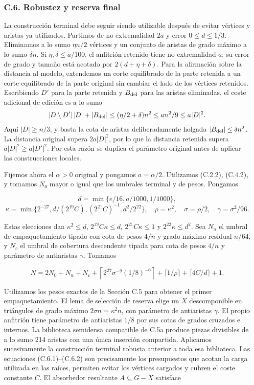 \documentclass[spanish,11pt,a4paper]{article}
\begin{document}
\subsubsection{C.6. Robustez y reserva final}\label{c.6.-robustez-y-reserva-final}

La construcción terminal debe seguir siendo utilizable después de evitar vértices y aristas ya utilizados. Partimos de no extremalidad \(2a\) y error \(0\le d\le1/3\). Eliminamos a lo sumo \(\eta n/2\) vértices y un conjunto de aristas de grado máximo a lo sumo \(\delta n\). Si \(\eta,\delta\le a/100\), el anfitrión retenido tiene no extremalidad \(a\); su error de grado y tamaño está acotado por \(2(d+\eta+\delta)\). Para la afirmación sobre la distancia al modelo, extendemos un corte equilibrado de la parte retenida a un corte equilibrado de la parte original sin cambiar el lado de los vértices retenidos. Escribiendo \(D'\) para la parte retenida y \(B_{\rm del}\) para las aristas eliminadas, el coste adicional de edición es a lo sumo \[|D\setminus D'|\,|D|+|B_{\rm del}|
\le(\eta/2+\delta)n^2\le an^2/9\le a|D|^2.\] Aquí \(|D|\ge n/3\), y basta la cota de aristas deliberadamente holgada \(|B_{\rm del}|\le\delta n^2\). La distancia original supera \(2a|D|^2\), por lo que la distancia retenida supera \(a|D|^2\ge a|D'|^2\). Por esta razón se duplica el parámetro original antes de aplicar las construcciones locales.

Fijemos ahora el \(\alpha>0\) original y pongamos \(a=\alpha/2\). Utilizamos (C.2.2), (C.4.2), y tomamos \(N_0\) mayor o igual que los umbrales terminal y de pesos. Pongamos

\[d=\min\{e/16,a/1000,1/1000\},\] \[\kappa=\min\{2^{-27},d/(2^{19}C),(2^{21}C)^{-1},d^2/2^{22}\},
\quad\rho=\kappa^2,\quad\sigma=\rho/2,\quad\gamma=\sigma^2/96.
\tag{C.6.1}\]

Estas elecciones dan \(\kappa^2\le d\), \(2^{19}C\kappa\le d\), \(2^{21}C\kappa\le1\) y \(2^{22}\kappa\le d^2\). Sea \(N_n\) el umbral de empaquetamiento tipado con cota de pesos \(4/n\) y grado máximo residual \(n/64\), y \(N_c\) el umbral de cobertura descendente tipada para cota de pesos \(4/n\) y parámetro de antiaristas \(\gamma\). Tomamos

\[N=2N_0+N_n+N_c+
\left\lceil2^{27}\sigma^{-9}(1/8)^{-6}\right\rceil
+\lceil1/\rho\rceil+\lceil4C/d\rceil+1.
\tag{C.6.2}\]

Utilizamos los pesos exactos de la Sección C.5 para obtener el primer empaquetamiento. El lema de selección de reserva elige un \(X\) descomponible en triángulos de grado máximo \(2\sigma n=\kappa^2n\), con parámetro de antiaristas \(\gamma\). El propio anfitrión tiene parámetro de antiaristas \(1/8\) por sus cotas de grados cruzados e internos. La biblioteca semidensa compatible de C.5a produce piezas divisibles de a lo sumo 214 aristas con una única inserción compartida. Aplicamos sucesivamente la construcción terminal robusta anterior a toda esa biblioteca. Las ecuaciones (C.6.1)--(C.6.2) son precisamente los presupuestos que acotan la carga utilizada en las raíces, permiten evitar los vértices cargados y cubren el coste constante \(C\). El absorbedor resultante \(A\subseteq G-X\) satisface
\end{document}
